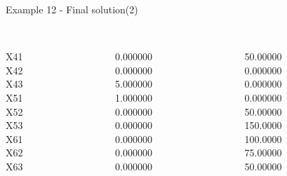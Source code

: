 \begin{frame}{Example 12 - Final solution(2)}
\footnotesize
\begin{columns}[t]
\begin{column}{0.3\textwidth}
\\
X41\\
X42\\
X43\\
X51\\
X52\\
X53\\
X61\\
X62\\
X63\\
\end{column}
\begin{column}{0.3\textwidth}
\\
0.000000\\
0.000000\\
5.000000\\
1.000000\\
0.000000\\
0.000000\\
0.000000\\
0.000000\\
0.000000\\
\end{column}  

\begin{column}{0.3\textwidth}
\\
50.00000\\
0.000000\\
0.000000\\
0.000000\\
50.00000\\
150.0000\\
100.0000\\
75.00000\\
50.00000\\
\end{column}
\end{columns}  
\end{frame}

